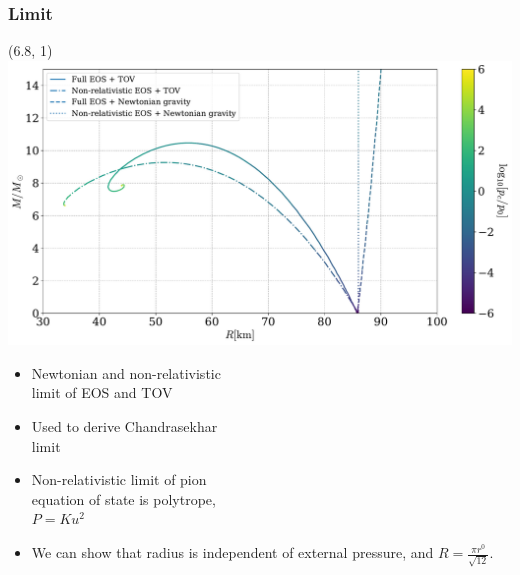 \documentclass[aspectratio=169]{beamer}
\begin{document}
    \begin{frame}
        \frametitle{Limit}
        
        \begin{textblock}{9}(6.8, 1)
            \includegraphics[width=\textwidth]{../../scripts/figurer/pion_star/mass_radius_comparison.pdf}
        \end{textblock}

        \begin{itemize}
            \itemsep 0.4cm
            \item Newtonian and non-relativistic \\ limit of EOS and TOV
            \item Used to derive Chandrasekhar \\ limit
            \item Non-relativistic limit of pion \\ equation of state is polytrope,\\ $P = Ku^2$
            \item We can show that radius is independent of external pressure, and $R = \frac{\pi r^0}{\sqrt{12}}$.
        \end{itemize}

    \end{frame}
\end{document}
